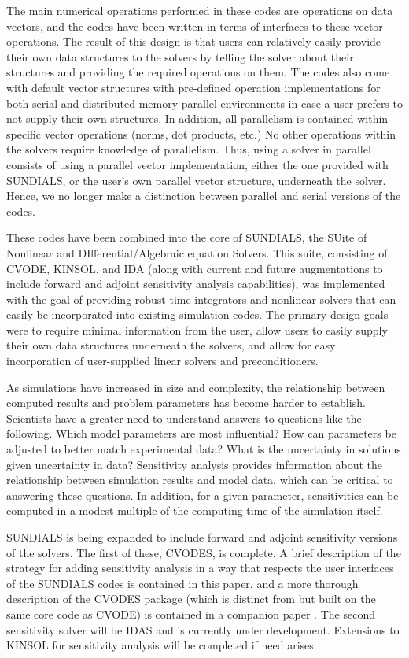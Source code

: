 The main numerical operations performed in these codes are
operations on data vectors, and the codes have been written in
terms of interfaces to these vector operations.  The result of
this design is that users can relatively easily provide their own
data structures to the solvers by telling the solver about their
structures and providing the required operations on them. The
codes also come with default vector structures
with pre-defined operation implementations for both serial and
distributed memory parallel environments in case a user prefers to
not supply their own structures. In addition, all parallelism is
contained within specific vector operations (norms, dot products,
etc.)  No other operations within the solvers require knowledge of
parallelism. Thus, using a solver in parallel consists of using
a parallel vector implementation, either the one provided with
SUNDIALS, or the user's own parallel vector structure, 
underneath the solver.  
Hence, we no longer make a distinction between parallel and serial 
versions of the codes.

These codes have been combined into the core of SUNDIALS, the
SUite of Nonlinear and DIfferential/Algebraic equation Solvers.
This suite, consisting of CVODE, KINSOL, and IDA (along with
current and future augmentations to include forward and adjoint
sensitivity analysis capabilities), was implemented with the goal
of providing robust time integrators and nonlinear solvers that
can easily be incorporated into existing simulation codes.  The
primary design goals were to require minimal information from the
user, allow users to easily supply their own data structures
underneath the solvers, and allow for easy incorporation of
user-supplied linear solvers and preconditioners.

As simulations have increased in size and complexity, the
relationship between computed results and problem parameters has
become harder to establish.  Scientists have a greater need to
understand answers to questions like the following.  Which model
parameters are most influential? How can parameters be adjusted to
better match experimental data? What is the uncertainty in
solutions given uncertainty in data?  Sensitivity analysis
provides information about the relationship between simulation
results and model data, which can be critical to answering these
questions. In addition, for a given parameter, sensitivities can
be computed in a modest multiple of the computing time of the
simulation itself.

SUNDIALS is being expanded to include forward and adjoint
sensitivity versions of the solvers. The first of these, CVODES,
is complete.  A brief description of the strategy for adding
sensitivity analysis in a way that respects the user interfaces of
the SUNDIALS codes is contained in this paper, and a more thorough
description of the CVODES package (which is distinct from but
built on the same core code as CVODE) is contained in a companion
paper \cite{SeHi:03}. The second sensitivity solver will be IDAS
and is currently under development. Extensions to KINSOL for
sensitivity analysis will be completed if need arises.

